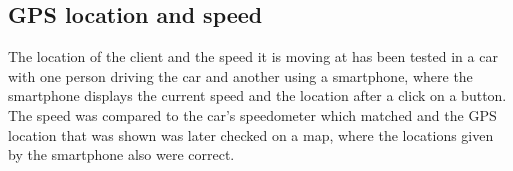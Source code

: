 \subsection{GPS location and speed}
The location of the client and the speed it is moving at has been tested in a car with one person driving the car and another using a smartphone, where the smartphone displays the current speed and the location after a click on a button. The speed was compared to the car's speedometer which matched and the GPS location that was shown was later checked on a map, where the locations given by the smartphone also were correct.

